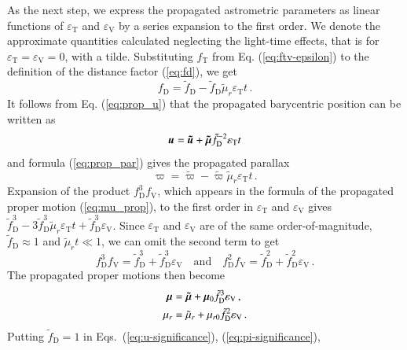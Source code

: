 \documentclass{aa}
\def\vec#1{\ensuremath{\mathchoice{\mbox{\boldmath$\displaystyle#1$}}
{\mbox{\boldmath$\textstyle#1$}}
{\mbox{\boldmath$\scriptstyle#1$}}
{\mbox{\boldmath$\scriptscriptstyle#1$}}}}
\begin{document}
As the next step, we express the propagated astrometric parameters as linear functions of $\varepsilon_\mathrm{T}$ and $\varepsilon_\mathrm{V}$ by a series expansion to the first order. We denote the approximate quantities calculated neglecting the light-time effects, that is for $\varepsilon_\mathrm{T}=\varepsilon_\mathrm{V}=0$, with a tilde. Substituting $f_\mathrm{T}$ from Eq. (\ref{eq:ftv-epsilon}) to the definition of the distance factor (\ref{eq:fd}), we get
\begin{equation}
  f_\mathrm{D}=\tilde{f}_\mathrm{D}-\tilde{f}_\mathrm{D}\tilde{\mu}_r\varepsilon_\mathrm{T}t\,.
\end{equation}
It follows from Eq. (\ref{eq:prop_u}) that the propagated barycentric position can be written as
\begin{equation}\label{eq:u-significance}
  \vec{u}=\vec{\tilde{u}}+\vec{\tilde{\mu}}\tilde{f}_\mathrm{D}^{-2}\varepsilon_\mathrm{T}t
\end{equation}
and formula (\ref{eq:prop_par}) gives the propagated parallax
\begin{equation}\label{eq:pi-significance}
  \varpi=\tilde{\varpi}-\tilde{\varpi}\tilde{\mu}_r\varepsilon_\mathrm{T}t\,.
\end{equation}
Expansion of the product $f_\mathrm{D}^3f_\mathrm{V}$, which appears in the formula of the propagated proper motion (\ref{eq:mu_prop}), to the first order in $\varepsilon_\mathrm{T}$ and $\varepsilon_\mathrm{V}$ gives $\tilde{f}_\mathrm{D}^3-3\tilde{f}_\mathrm{D}^3\tilde{\mu}_r\varepsilon_\mathrm{T}t+\tilde{f}_\mathrm{D}^3\varepsilon_\mathrm{V}$.
Since $\varepsilon_\mathrm{T}$ and $\varepsilon_\mathrm{V}$ are of the same order-of-magnitude, $\tilde{f}_\mathrm{D}\approx 1$ and $\tilde{\mu}_rt\ll 1$, we can omit the second term to get
\begin{equation}
  f_\mathrm{D}^3f_\mathrm{V}=\tilde{f}_\mathrm{D}^3+\tilde{f}_\mathrm{D}^3\varepsilon_\mathrm{V}
  \quad \mathrm{and} \quad
  f_\mathrm{D}^2f_\mathrm{V}=\tilde{f}_\mathrm{D}^2+\tilde{f}_\mathrm{D}^2\varepsilon_\mathrm{V}\,.
\end{equation}
The propagated proper motions then become
\begin{align}
    \label{eq:mu-significance}
    \vec{\mu}&=
    \vec{\tilde{\mu}}+\vec{\mu}_0{\tilde{f}_\mathrm{D}}^3\varepsilon_\mathrm{V}\,, \\
    \label{eq:mur-significance}
    \mu_r&=
    \tilde{\mu}_r+\mu_{r0}\tilde{f}_\mathrm{D}^2\varepsilon_\mathrm{V}\,.
\end{align}
Putting $\tilde{f}_\mathrm{D}=1$ in Eqs.~(\ref{eq:u-significance}), (\ref{eq:pi-significance}),
\end{document}
